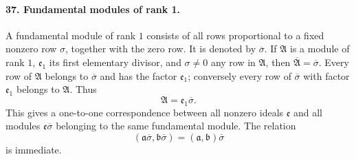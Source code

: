 \documentclass[11pt]{article}
\begin{document}
\paragraph{37. Fundamental modules of rank 1.}
A fundamental module of rank $1$ consists of all rows proportional to a fixed nonzero row $\sigma$, together with the zero row. It is denoted by $\overline{\sigma}$. If $\mathfrak A$ is a module of rank $1$, $\mathfrak e_1$ its first elementary divisor, and $\sigma\ne0$ any row in $\mathfrak A$, then $\overline{\mathfrak A}=\overline{\sigma}$. Every row of $\mathfrak A$ belongs to $\overline{\sigma}$ and has the factor $\mathfrak e_1$; conversely every row of $\overline{\sigma}$ with factor $\mathfrak e_1$ belongs to $\mathfrak A$. Thus
\[
\mathfrak A=\mathfrak e_1\overline{\sigma}.
\]
This gives a one-to-one correspondence between all nonzero ideals $\mathfrak e$ and all modules $\mathfrak e\overline{\sigma}$ belonging to the same fundamental module. The relation
\begin{equation}
(\mathfrak a\overline{\sigma},\mathfrak b\overline{\sigma})=(\mathfrak a,\mathfrak b)\overline{\sigma}
\tag{46}
\end{equation}
is immediate.
\end{document}
